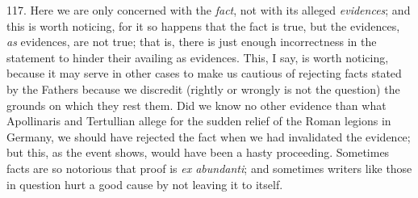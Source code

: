 117.
Here we are only concerned with the \emph{fact}, not with its alleged \emph{evidences};
and this is worth noticing, for it so happens that the fact is true,
but the evidences, \emph{as} evidences, are not true; that is, there
is just enough incorrectness in the statement to hinder their availing
as evidences. This, I say, is worth noticing, because it may serve in
other cases to make us cautious of rejecting facts stated by the
Fathers because we discredit (rightly or wrongly is not the question)
the grounds on which they rest them. Did we know no other evidence
than what Apollinaris and Tertullian allege for the sudden relief of
the Roman legions in Germany, we should have rejected the fact when we
had invalidated the evidence; but this, as the event shows,
would have been a hasty proceeding. Sometimes facts are so notorious
that proof is \emph{ex abundanti}; and sometimes writers like those in
question hurt a good cause by not leaving it to itself.

